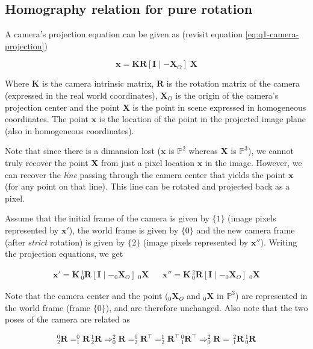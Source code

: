 \subsection{Homography relation for pure rotation}

A camera's projection equation can be given as (revisit equation \ref{eq:q1-camera-projection})

\begin{equation}
    \mathbf{x} = \mathbf{KR} [ \mathbf{I} \mid - \mathbf{X}_O ] \; \mathbf{X}
\end{equation}

Where $\mathbf{K}$ is the camera intrinsic matrix, $\mathbf{R}$ is the rotation matrix of the camera (expressed in the real world coordinates), $\mathbf{X}_O$ is the origin of the camera's projection center and the point $\mathbf{X}$ is the point in scene expressed in homogeneous coordinates. The point $\mathbf{x}$ is the location of the point in the projected image plane (also in homogeneous coordinates).

Note that since there is a dimansion lost ($\mathbf{x}$ is $\mathbb{P}^2$ whereas $\mathbf{X}$ is $\mathbb{P}^3$), we cannot truly recover the point $\mathbf{X}$ from just a pixel location $\mathbf{x}$ in the image. However, we can recover the \textit{line} passing through the camera center that yields the point $\mathbf{x}$ (for any point on that line). This line can be rotated and projected back as a pixel.

Assume that the initial frame of the camera is given by $\{1\}$ (image pixels represented by $\mathbf{x}'$), the world frame is given by $\{0\}$ and the new camera frame (after \textit{strict} rotation) is given by $\{2\}$ (image pixels represented by $\mathbf{x''}$). Writing the projection equations, we get

\begin{align}
    \mathbf{x}' = \mathbf{K} \, ^1_0\mathbf{R} [ \mathbf{I} \mid - _0\mathbf{X}_O ] \; _0\mathbf{X}
    &&
    \mathbf{x}'' = \mathbf{K} \, ^2_0\mathbf{R} [ \mathbf{I} \mid - _0\mathbf{X}_O ] \; _0\mathbf{X}
    \label{eq:q2a-rot-cam-projeqs}
\end{align}

Note that the camera center and the point ($_0\mathbf{X}_O$ and $_0\mathbf{X}$ in $\mathbb{P}^3$) are represented in the world frame (frame $\{0\}$), and are therefore unchanged. Also note that the two poses of the camera are related as

\begin{equation}
    ^0_2\mathbf{R} = ^0_1\mathbf{R} \, ^1_2\mathbf{R}
    \Rightarrow ^2_0\mathbf{R} = ^0_2\mathbf{R}^\top = ^1_2\mathbf{R}^\top \, ^0_1\mathbf{R}^\top 
    \Rightarrow ^2_0\mathbf{R} = \, ^2_1\mathbf{R} \, ^1_0\mathbf{R}
    \label{eq:q2a-rel-rotmat}
\end{equation}

